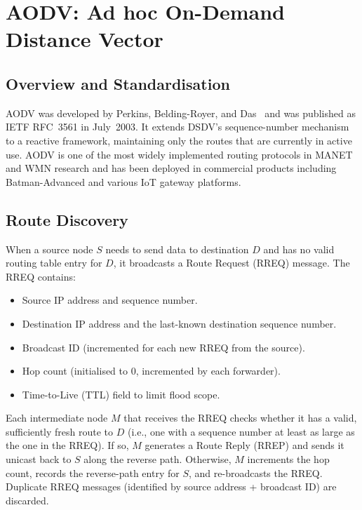 \section{AODV: Ad hoc On-Demand Distance Vector}

\subsection{Overview and Standardisation}

AODV was developed by Perkins, Belding-Royer, and Das~\cite{perkins2003aodv} and was
published as IETF RFC~3561 in July~2003. It extends DSDV's sequence-number mechanism
to a reactive framework, maintaining only the routes that are currently in active use.
AODV is one of the most widely implemented routing protocols in MANET and WMN research
and has been deployed in commercial products including Batman-Advanced and various IoT
gateway platforms.

\subsection{Route Discovery}

When a source node $S$ needs to send data to destination $D$ and has no valid routing
table entry for $D$, it broadcasts a Route Request (RREQ) message. The RREQ contains:

\begin{itemize}
  \item Source IP address and sequence number.
  \item Destination IP address and the last-known destination sequence number.
  \item Broadcast ID (incremented for each new RREQ from the source).
  \item Hop count (initialised to 0, incremented by each forwarder).
  \item Time-to-Live (TTL) field to limit flood scope.
\end{itemize}

Each intermediate node $M$ that receives the RREQ checks whether it has a valid,
sufficiently fresh route to $D$ (i.e., one with a sequence number at least as large as
the one in the RREQ). If so, $M$ generates a Route Reply (RREP) and sends it unicast
back to $S$ along the reverse path. Otherwise, $M$ increments the hop count, records
the reverse-path entry for $S$, and re-broadcasts the RREQ. Duplicate RREQ messages
(identified by source address + broadcast ID) are discarded.

